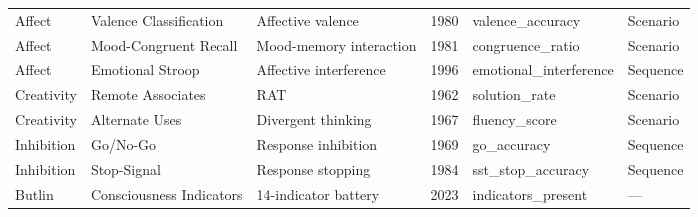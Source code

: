 \documentclass[10pt,landscape]{article}
\begin{document}
\begin{longtable}{@{}p{2.3cm}p{3.0cm}p{4.5cm}p{0.6cm}p{3.8cm}p{1.8cm}@{}}
\midrule
Affect & Valence Classification & Affective valence & 1980 & valence\_accuracy & Scenario \\
Affect & Mood-Congruent Recall & Mood-memory interaction \citep{bower1981mood} & 1981 & congruence\_ratio & Scenario \\
Affect & Emotional Stroop & Affective interference \citep{williams1996emotional} & 1996 & emotional\_interference & Sequence \\

\midrule
Creativity & Remote Associates & RAT \citep{mednick1962associative} & 1962 & solution\_rate & Scenario \\
Creativity & Alternate Uses & Divergent thinking & 1967 & fluency\_score & Scenario \\

\midrule
Inhibition & Go/No-Go & Response inhibition & 1969 & go\_accuracy & Sequence \\
Inhibition & Stop-Signal & Response stopping \citep{logan1984ability} & 1984 & sst\_stop\_accuracy & Sequence \\

\midrule
Butlin & Consciousness Indicators & 14-indicator battery \citep{butlin2023consciousness} & 2023 & indicators\_present & --- \\


\end{longtable}
\end{document}
